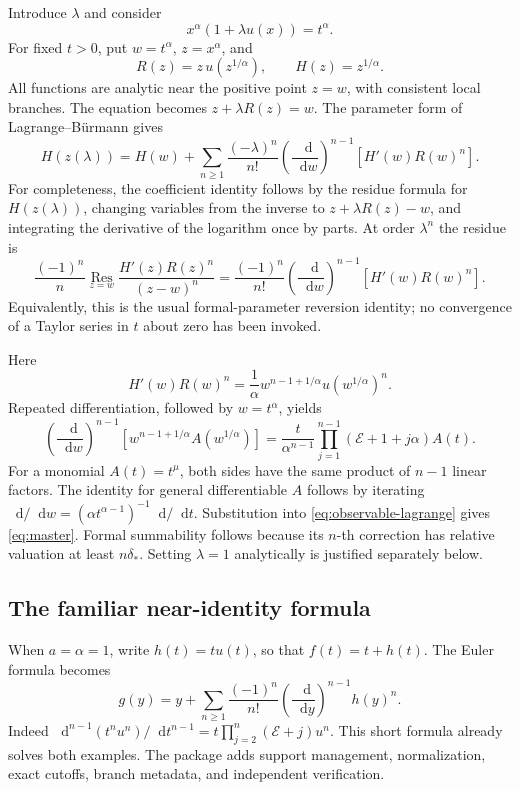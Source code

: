 \documentclass[11pt,a4paper]{article}
\numberwithin{equation}{section}
\theoremstyle{definition}\newtheorem{definition}[theorem]{Definition}
\theoremstyle{remark}\newtheorem{remark}[theorem]{Remark}
\newcommand{\Eul}{\mathcal E}
\newcommand{\dd}{\mathop{}\!\mathrm d}
\begin{document}
Introduce \(\lambda\) and consider
\[
 x^\alpha(1+\lambda u(x))=t^\alpha.
\]
For fixed \(t>0\), put \(w=t^\alpha\), \(z=x^\alpha\), and
\[
 R(z)=z\,u(z^{1/\alpha}),\qquad H(z)=z^{1/\alpha}.
\]
All functions are analytic near the positive point \(z=w\), with consistent
local branches. The equation becomes \(z+\lambda R(z)=w\).
The parameter form of Lagrange--B\"urmann gives
\begin{equation}\label{eq:observable-lagrange}
 H(z(\lambda))=H(w)+\sum_{n\ge1}\frac{(-\lambda)^n}{n!}
 \left(\frac{\dd}{\dd w}\right)^{n-1}
       \left[H'(w)R(w)^n\right].
\end{equation}
For completeness, the coefficient identity follows by the residue formula
for \(H(z(\lambda))\), changing variables from the inverse to
\(z+\lambda R(z)-w\), and integrating the derivative of the logarithm once
by parts. At order \(\lambda^n\) the residue is
\[
 \frac{(-1)^n}{n}\operatorname*{Res}_{z=w}
 \frac{H'(z)R(z)^n}{(z-w)^n}
 =\frac{(-1)^n}{n!}
 \left(\frac{\dd}{\dd w}\right)^{n-1}[H'(w)R(w)^n].
\]
Equivalently, this is the usual formal-parameter reversion identity; no
convergence of a Taylor series in \(t\) about zero has been invoked.

Here
\[
 H'(w)R(w)^n=\frac1\alpha
 w^{n-1+1/\alpha}u(w^{1/\alpha})^n.
\]
Repeated differentiation, followed by \(w=t^\alpha\), yields
\begin{equation}\label{eq:euler-transform}
 \left(\frac{\dd}{\dd w}\right)^{n-1}
 \left[w^{n-1+1/\alpha}A(w^{1/\alpha})\right]
 =\frac{t}{\alpha^{n-1}}
   \prod_{j=1}^{n-1}(\Eul+1+j\alpha)A(t).
\end{equation}
For a monomial \(A(t)=t^\mu\), both sides have the same product of
\(n-1\) linear factors. The identity for general differentiable \(A\)
follows by iterating \(\dd/\dd w=(\alpha t^{\alpha-1})^{-1}\dd/\dd t\).
Substitution into \eqref{eq:observable-lagrange} gives \eqref{eq:master}.
Formal summability follows because its \(n\)-th correction has relative
valuation at least \(n\delta_*\). Setting \(\lambda=1\) analytically is
justified separately below.

\subsection{The familiar near-identity formula}
When \(a=\alpha=1\), write \(h(t)=t u(t)\), so that \(f(t)=t+h(t)\).
The Euler formula becomes
\begin{equation}\label{eq:unit-master}
 \boxed{\displaystyle
 g(y)=y+\sum_{n\ge1}\frac{(-1)^n}{n!}
             \left(\frac{\dd}{\dd y}\right)^{n-1}h(y)^n.}
\end{equation}
Indeed
\(\dd^{n-1}(t^n u^n)/\dd t^{n-1}
=t\prod_{j=2}^{n}(\Eul+j)u^n\).
This short formula already solves both examples. The package adds support
management, normalization, exact cutoffs, branch metadata, and independent
verification.
\end{document}
